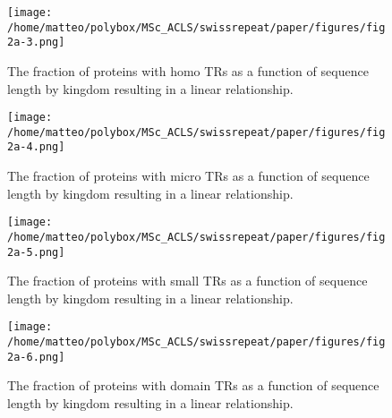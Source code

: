 \documentclass[a4,center,fleqn]{NAR}
\begin{document}
\begin{figure*}[h]
\begin{center}
\texttt{[image: /home/matteo/polybox/MSc\_ACLS/swissrepeat/paper/figures/fig2a-3.png]}
\end{center}
\caption{The fraction of proteins with homo TRs as a function of sequence length by kingdom resulting in a linear relationship.}
\label{sup:fig2a-3}
\end{figure*}

\begin{figure*}[h]
\begin{center}
\texttt{[image: /home/matteo/polybox/MSc\_ACLS/swissrepeat/paper/figures/fig2a-4.png]}
\end{center}
\caption{The fraction of proteins with micro TRs as a function of sequence length by kingdom resulting in a linear relationship.}
\label{sup:fig2a-4}
\end{figure*}

\begin{figure*}[h]
\begin{center}
\texttt{[image: /home/matteo/polybox/MSc\_ACLS/swissrepeat/paper/figures/fig2a-5.png]}
\end{center}
\caption{The fraction of proteins with small TRs as a function of sequence length by kingdom resulting in a linear relationship.}
\label{sup:fig2a-5}
\end{figure*}

\begin{figure*}[h]
\begin{center}
\texttt{[image: /home/matteo/polybox/MSc\_ACLS/swissrepeat/paper/figures/fig2a-6.png]}
\end{center}
\caption{The fraction of proteins with domain TRs as a function of sequence length by kingdom resulting in a linear relationship.}
\label{sup:fig2a-6}
\end{figure*}
\end{document}

